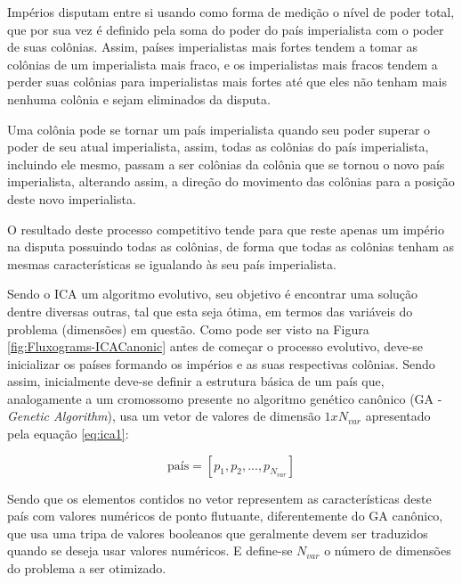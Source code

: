 Impérios disputam entre si usando como forma de medição o nível de poder total, que por sua vez é definido pela soma do poder do país imperialista com o poder de suas colônias. Assim, países imperialistas mais fortes tendem a tomar as colônias de um imperialista mais fraco, e os imperialistas mais fracos tendem a perder suas colônias para imperialistas mais fortes até que eles não tenham mais nenhuma colônia e sejam eliminados da disputa. 

Uma colônia pode se tornar um país imperialista quando seu poder superar o poder de seu atual imperialista, assim, todas as colônias do país imperialista, incluindo ele mesmo, passam a ser colônias da colônia que se tornou o novo país imperialista, alterando assim, a direção do movimento das colônias para a posição deste novo imperialista.

O resultado deste processo competitivo tende para que reste apenas um império na disputa possuindo todas as colônias, de forma que todas as colônias tenham as mesmas características se igualando às seu país imperialista.

Sendo o ICA um algoritmo evolutivo, seu objetivo é encontrar uma solução dentre diversas outras, tal que esta seja ótima, em termos das variáveis do problema (dimensões) em questão.  Como pode ser visto na Figura \ref{fig:Fluxograms-ICACanonic} antes de começar o processo evolutivo, deve-se inicializar os países formando os impérios e as suas respectivas colônias. Sendo assim, inicialmente deve-se definir a estrutura básica de um país que, analogamente a um cromossomo presente no algoritmo genético canônico (GA - \emph{Genetic Algorithm}), usa um vetor de valores de dimensão \(1xN_{var}\) apresentado pela equação \ref{eq:ica1}:

\begin{equation}
\label{eq:ica1}
\text{país} = [p_{1},p_{2},...,p_{N_{var}}] 
\end{equation}

Sendo que os elementos contidos no vetor representem as características deste país com valores numéricos de ponto flutuante, diferentemente do GA canônico, que usa uma tripa de valores booleanos que geralmente devem ser traduzidos quando se deseja usar valores numéricos. E define-se \(N_{var}\) o número de dimensões do problema a ser otimizado. 

